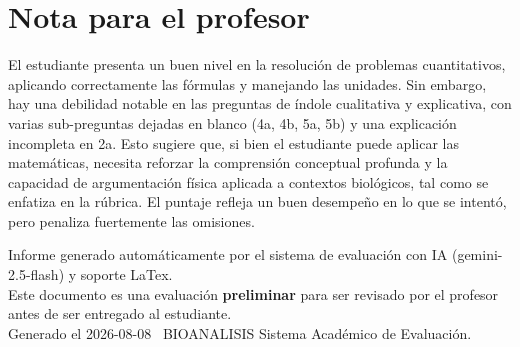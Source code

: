 \documentclass[11pt,a4paper]{article}
\begin{document}
\section*{Nota para el profesor}
\begin{tcolorbox}[
  enhanced, breakable,
  colback=yellow!8, colframe=yellow!60!black,
  fonttitle=\bfseries, coltitle=black,
  title={Observaciones para revisión manual},
  top=4pt, bottom=4pt, left=8pt, right=8pt,
]
El estudiante presenta un buen nivel en la resolución de problemas cuantitativos, aplicando correctamente las fórmulas y manejando las unidades. Sin embargo, hay una debilidad notable en las preguntas de índole cualitativa y explicativa, con varias sub-preguntas dejadas en blanco (4a, 4b, 5a, 5b) y una explicación incompleta en 2a. Esto sugiere que, si bien el estudiante puede aplicar las matemáticas, necesita reforzar la comprensión conceptual profunda y la capacidad de argumentación física aplicada a contextos biológicos, tal como se enfatiza en la rúbrica. El puntaje refleja un buen desempeño en lo que se intentó, pero penaliza fuertemente las omisiones.
\end{tcolorbox}

\vspace{12pt}
\begin{center}
  \footnotesize\color{gray}
  Informe generado automáticamente por el sistema de evaluación con IA (gemini-2.5-flash) y soporte LaTex. \\
  Este documento es una evaluación \textbf{preliminar} para ser revisado por el profesor antes de ser entregado al 
  estudiante. \\
  Generado el 2026-08-08 \textbullet\ BIOANALISIS Sistema Académico de Evaluación.
  \end{center}
\end{document}
